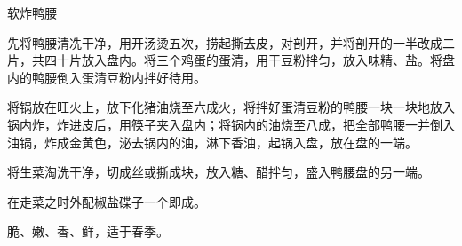 \begin{recipe}{软炸鸭腰}

\ingredients


\cooking

\step 先将鸭腰清冼干净，用开汤烫五次，捞起撕去皮，对剖开，并将剖开的一半改成二片，共四十片放入盘内。将三个鸡蛋的蛋清，用干豆粉拌匀，放入味精、盐。将盘内的鸭腰倒入蛋清豆粉内拌好待用。

\step 将锅放在旺火上，放下化猪油烧至六成火，将拌好蛋清豆粉的鸭腰一块一块地放入锅内炸，炸进皮后，用筷子夹入盘内；将锅内的油烧至八成，把全部鸭腰一并倒入油锅，炸成金黄色，泌去锅内的油，淋下香油，起锅入盘，放在盘的一端。

\step 将生菜淘洗干净，切成丝或撕成块，放入糖、醋拌匀，盛入鸭腰盘的另一端。

\step 在走菜之时外配椒盐碟子一个即成。

\notes

脆、嫩、香、鲜，适于春季。

\end{recipe}

